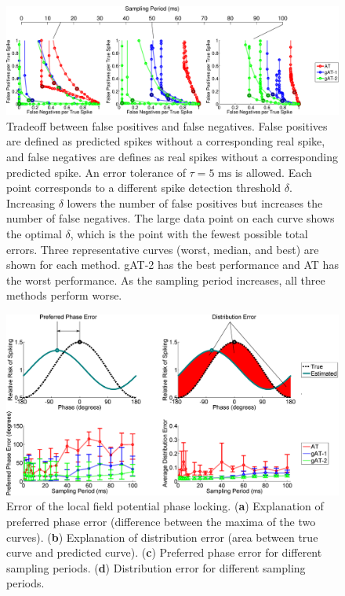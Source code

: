 \documentclass[10 pt]{article}
\begin{document}
\begin{figure}[htbp]
\begin{center}
\includegraphics[scale=0.30]{roc.eps}
\caption{Tradeoff between false positives and false negatives. False positives are defined as predicted spikes without a corresponding real spike, and false negatives are defines as real spikes without a corresponding predicted spike. An error tolerance of $\tau = 5\textrm{ ms}$ is allowed. Each point corresponds to a different spike detection threshold $\delta$. Increasing $\delta$ lowers the number of false positives but increases the number of false negatives. The large data point on each curve shows the optimal $\delta$, which is the point with the fewest possible total errors. Three representative curves (worst, median, and best) are shown for each method. gAT-2 has the best performance and AT has the worst performance. As the sampling period increases, all three methods perform worse.} %
\label{fig:ROC}
\end{center}
\end{figure}

\begin{figure}[htbp]
\begin{center}
\includegraphics[scale=0.30]{LFP_error.eps}
\caption{Error of the local field potential phase locking. (\textbf{a}) Explanation of preferred phase error (difference between the maxima of the two curves). (\textbf{b}) Explanation of distribution error (area between true curve and predicted curve). (\textbf{c}) Preferred phase error for different sampling periods. (\textbf{d}) Distribution error for different sampling periods.}
\label{fig:LFP_error}
\end{center}
\end{figure}
\end{document}
